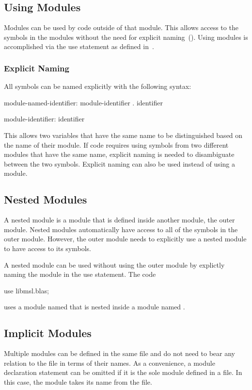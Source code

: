 \subsection{Using Modules}
\label{Using_Modules}

Modules can be used by code outside of that module.  This allows
access to the symbols in the modules without the need for explicit
naming~().  Using modules is accomplished via
the use statement as defined in~.

\subsubsection{Explicit Naming}
\label{Explicit_Naming}

All symbols can be named explicitly with the following syntax:
\begin{syntax}
module-named-identifier:
  module-identifier . identifier

module-identifier:
  identifier
\end{syntax}
This allows two variables that have the same name to be distinguished
based on the name of their module.  If code requires using symbols
from two different modules that have the same name, explicit naming is
needed to disambiguate between the two symbols.  Explicit naming can
also be used instead of using a module.

\subsection{Nested Modules}
\label{Nested_Modules}

A nested module is a module that is defined inside another module, the
outer module.  Nested modules automatically have access to all of the
symbols in the outer module.  However, the outer module needs to
explicitly use a nested module to have access to its symbols.

\begin{example}
A nested module can be used without using the outer module by
explictly naming the module in the use statement.  The code
\begin{chapel}
use libmsl.blas;
\end{chapel}
uses a module named  that is nested inside a module
named .
\end{example}

\subsection{Implicit Modules}
\label{Implicit_Modules}

Multiple modules can be defined in the same file and do not need to
bear any relation to the file in terms of their names.  As a
convenience, a module declaration statement can be omitted if it is
the sole module defined in a file.  In this case, the module takes its
name from the file.
